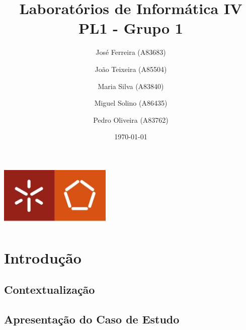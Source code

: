 \documentclass[a4paper]{report}
\begin{document}
\title{Laboratórios de Informática IV\\
\large PL1 - Grupo 1}
\author{José Ferreira (A83683) \and João Teixeira (A85504) \and Maria Silva (A83840) \and Miguel Solino (A86435) \and Pedro Oliveira (A83762)}
\date{\today}

\begin{center}
    \begin{minipage}{0.75\linewidth}
        \centering
        \includegraphics[width=0.4\textwidth]{images/eng.jpeg}\par\vspace{1cm}
        \vspace{1.5cm}
        \href{https://www.uminho.pt/PT}
        {\color{black}{\scshape\LARGE Universidade do Minho}} \par
        \vspace{1cm}
        \href{https://www.di.uminho.pt/}
        {\color{black}{\scshape\Large Departamento de Informática}} \par
        \vspace{1.5cm}
        \maketitle
    \end{minipage}
\end{center}


\tableofcontents

\chapter{Introdução}
    \section{Contextualização}

    \section{Apresentação do Caso de Estudo}
\end{document}
